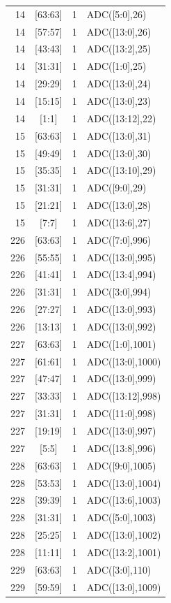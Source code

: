 \begin{longtable}{@{}r c r p{9.5cm}@{}}
14 & [63:63] & 1 & ADC([5:0],26) \\
14 & [57:57] & 1 & ADC([13:0],26) \\
14 & [43:43] & 1 & ADC([13:2],25) \\
14 & [31:31] & 1 & ADC([1:0],25) \\
14 & [29:29] & 1 & ADC([13:0],24) \\
14 & [15:15] & 1 & ADC([13:0],23) \\
14 & [1:1] & 1 & ADC([13:12],22) \\
15 & [63:63] & 1 & ADC([13:0],31) \\
15 & [49:49] & 1 & ADC([13:0],30) \\
15 & [35:35] & 1 & ADC([13:10],29) \\
15 & [31:31] & 1 & ADC([9:0],29) \\
15 & [21:21] & 1 & ADC([13:0],28) \\
15 & [7:7] & 1 & ADC([13:6],27) \\
226 & [63:63] & 1 & ADC([7:0],996) \\
226 & [55:55] & 1 & ADC([13:0],995) \\
226 & [41:41] & 1 & ADC([13:4],994) \\
226 & [31:31] & 1 & ADC([3:0],994) \\
226 & [27:27] & 1 & ADC([13:0],993) \\
226 & [13:13] & 1 & ADC([13:0],992) \\
227 & [63:63] & 1 & ADC([1:0],1001) \\
227 & [61:61] & 1 & ADC([13:0],1000) \\
227 & [47:47] & 1 & ADC([13:0],999) \\
227 & [33:33] & 1 & ADC([13:12],998) \\
227 & [31:31] & 1 & ADC([11:0],998) \\
227 & [19:19] & 1 & ADC([13:0],997) \\
227 & [5:5] & 1 & ADC([13:8],996) \\
228 & [63:63] & 1 & ADC([9:0],1005) \\
228 & [53:53] & 1 & ADC([13:0],1004) \\
228 & [39:39] & 1 & ADC([13:6],1003) \\
228 & [31:31] & 1 & ADC([5:0],1003) \\
228 & [25:25] & 1 & ADC([13:0],1002) \\
228 & [11:11] & 1 & ADC([13:2],1001) \\
229 & [63:63] & 1 & ADC([3:0],110) \\
229 & [59:59] & 1 & ADC([13:0],1009) \\

\end{longtable}
